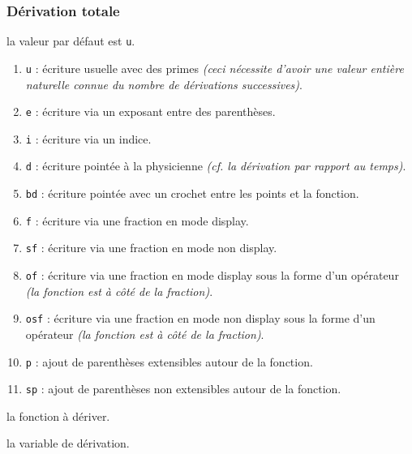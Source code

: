 \documentclass[12pt,a4paper]{article}
\theoremstyle{definition}
\begin{document}
\subsubsection{Dérivation totale}


\IDoption{} la valeur par défaut est \verb+u+. 
\begin{enumerate}
	\item \verb+u+ : écriture usuelle avec des primes \emph{(ceci nécessite d'avoir une valeur entière naturelle connue du nombre de dérivations successives)}.

	\item \verb+e+ : écriture via un exposant entre des parenthèses.
	
	\item \verb+i+ : écriture via un indice.

	\item \verb+d+ : écriture pointée à la physicienne \emph{(cf. la dérivation par rapport au temps)}.

	\item \verb+bd+ : écriture pointée avec un crochet entre les points et la fonction.

	\medskip
	
	\item \verb+f+ : écriture via une fraction en mode display.

	\item \verb+sf+ : écriture via une fraction en mode non display.

	\item \verb+of+ : écriture via une fraction en mode display sous la forme d'un opérateur \emph{(la fonction est à côté de la fraction)}.

	\item \verb+osf+ : écriture via une fraction en mode non display sous la forme d'un opérateur \emph{(la fonction est à côté de la fraction)}.

	\medskip
	
	\item \verb+p+ : ajout de parenthèses extensibles autour de la fonction.

	\item \verb+sp+ : ajout de parenthèses non extensibles autour de la fonction.
\end{enumerate}


 la fonction à dériver.

 la variable de dérivation.
\end{document}
